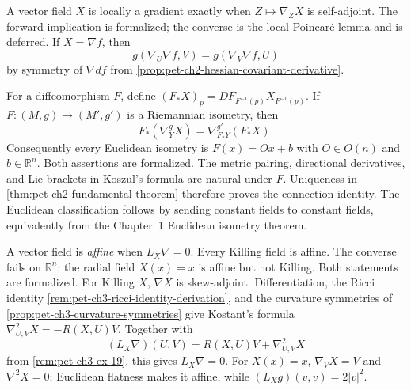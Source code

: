 \begin{remark}
  \label{rem:pet-ch2-ex-11}


  A vector field $X$ is locally a gradient
  exactly when $Z\mapsto\nabla_ZX$ is self-adjoint.
  The forward implication is formalized; the converse is the local
  Poincar\'e lemma and is deferred.
  \sketch
  If $X=\nabla f$, then
  \[
    g(\nabla_U\nabla f,V)=g(\nabla_V\nabla f,U)
  \]
  by symmetry of $\nabla df$ from
  \cref{prop:pet-ch2-hessian-covariant-derivative}.
\end{remark}

\begin{remark}
  \label{rem:pet-ch2-ex-12}


  For a diffeomorphism $F$, define
  $(F_*X)_p=DF_{F^{-1}(p)}X_{F^{-1}(p)}$. If $F:(M,g)\to(M',g')$ is a
  Riemannian isometry, then
  \[
    F_*(\nabla^g_YX)=\nabla^{g'}_{F_*Y}(F_*X).
  \]
  Consequently every Euclidean isometry is $F(x)=Ox+b$ with
  $O\in O(n)$ and $b\in\mathbb{R}^n$. Both assertions are formalized.
  \sketch
  The metric pairing, directional derivatives, and Lie brackets in Koszul's
  formula are natural under $F$. Uniqueness in
  \cref{thm:pet-ch2-fundamental-theorem} therefore proves the connection
  identity. The Euclidean classification follows by sending constant fields
  to constant fields, equivalently from the Chapter~1 Euclidean isometry
  theorem.
\end{remark}

\begin{remark}
  \label{rem:pet-ch2-ex-13}


  A vector field is \emph{affine} when
  $L_X\nabla=0$. Every Killing field is affine. The converse fails on
  $\mathbb{R}^n$: the radial field $X(x)=x$ is affine but not Killing. Both
  statements are formalized.
  \sketch
  For Killing $X$, $\nabla X$ is skew-adjoint. Differentiation, the Ricci
  identity \cref{rem:pet-ch3-ricci-identity-derivation}, and the curvature
  symmetries of \cref{prop:pet-ch3-curvature-symmetries} give Kostant's formula
  $\nabla^2_{U,V}X=-R(X,U)V$. Together with
  \[
    (L_X\nabla)(U,V)=R(X,U)V+\nabla^2_{U,V}X
  \]
  from \cref{rem:pet-ch3-ex-19}, this gives $L_X\nabla=0$. For $X(x)=x$,
  $\nabla_VX=V$ and $\nabla^2X=0$; Euclidean flatness makes it affine, while
  $(L_Xg)(v,v)=2|v|^2$.
\end{remark}

